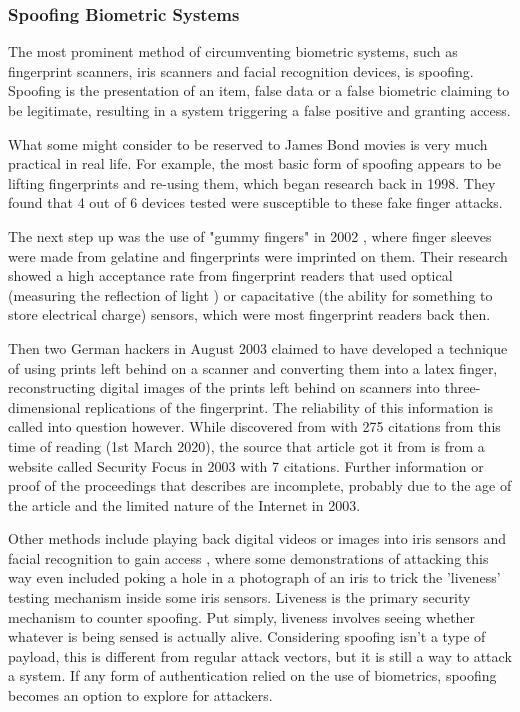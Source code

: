 \documentclass[a4paper, 11pt]{article}
\begin{document}
\subsubsection{Spoofing Biometric Systems}
\label{sec:spoofingbiometric}
The most prominent method of circumventing biometric systems, such as fingerprint scanners, iris scanners and facial recognition devices, is spoofing. \cite{ref:biometricattackvectors} Spoofing is the presentation of an item, false data or a false biometric claiming to be legitimate, resulting in a system triggering a false positive and granting access. \cite{ref:biometricattackvectors}

What some might consider to be reserved to James Bond movies is very much practical in real life. For example, the most basic form of spoofing appears to be lifting fingerprints and re-using them, which began research back in 1998. \cite{ref:biometricattackvectors,ref:willis1998six} They found that 4 out of 6 devices tested were susceptible to these fake finger attacks. \cite{ref:willis1998six}

The next step up was the use of "gummy fingers" in 2002 \cite{ref:matsumoto2002impact}, where finger sleeves were made from gelatine and fingerprints were imprinted on them. Their research showed a high acceptance rate from fingerprint readers that used optical (measuring the reflection of light \cite{ref:matsumoto2002impact}) or capacitative (the ability for something to store electrical charge) sensors, which were most fingerprint readers back then. \cite{ref:matsumoto2002impact}

Then two German hackers in August 2003 claimed to have developed a technique of using prints left behind on a scanner and converting them into a latex finger, reconstructing digital images of the prints left behind on scanners into three-dimensional replications of the fingerprint. \cite{ref:biometricattackvectors,ref:harrison2003hackers} The reliability of this information is called into question however. While discovered from \cite{ref:biometricattackvectors} with 275 citations from this time of reading (1st March 2020), the source that article got it from \cite{ref:harrison2003hackers} is from a website called Security Focus in 2003 with 7 citations. Further information or proof of the proceedings that \cite{ref:harrison2003hackers} describes are incomplete, probably due to the age of the article and the limited nature of the Internet in 2003.

Other methods include playing back digital videos or images into iris sensors and facial recognition to gain access \cite{ref:bodybiometrie,ref:biometricattackvectors}, where some demonstrations of attacking this way even included poking a hole in a photograph of an iris to trick the 'liveness' testing mechanism inside some iris sensors. Liveness is the primary security mechanism to counter spoofing. Put simply, liveness involves seeing whether whatever is being sensed is actually alive. \cite{ref:biometricattackvectors} Considering spoofing isn't a type of payload, this is different from regular attack vectors, but it is still a way to attack a system. If any form of authentication relied on the use of biometrics, spoofing becomes an option to explore for attackers.
\end{document}

